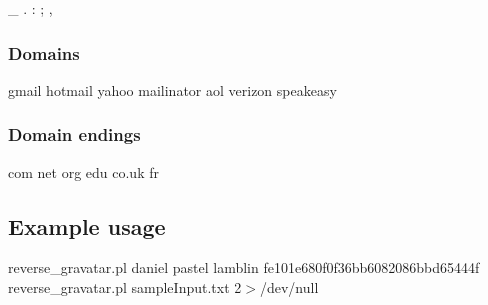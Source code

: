 \_ . : ; ,

\subsubsection*{Domains\label{Domains}}


gmail hotmail yahoo mailinator aol verizon speakeasy

\subsubsection*{Domain endings\label{Domain_endings}}


com net org edu co.uk fr

\subsection*{Example usage\label{Example_usage}}


reverse\_gravatar.pl daniel pastel lamblin fe101e680f0f36bb6082086bbd65444f
reverse\_gravatar.pl sampleInput.txt 2$>$/dev/null


